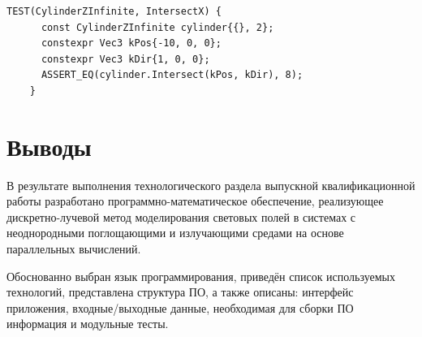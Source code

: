 \begin{lstlisting}[gobble=8, caption={Юнит-тест метода пересечения луча с поверхностью цилиндра\label{lst:cpp-unit-tests-intersection}}]
	TEST(CylinderZInfinite, IntersectX) {
	  const CylinderZInfinite cylinder{{}, 2};
	  constexpr Vec3 kPos{-10, 0, 0};
	  constexpr Vec3 kDir{1, 0, 0};
	  ASSERT_EQ(cylinder.Intersect(kPos, kDir), 8);
	}
\end{lstlisting}

\section*{Выводы}

В результате выполнения технологического раздела выпускной квалификационной работы разработано программно-математическое обеспечение, реализующее дискретно-лучевой метод моделирования световых полей в системах с неоднородными поглощающими и излучающими средами на основе параллельных вычислений.

Обоснованно выбран язык программирования, приведён список используемых технологий, представлена структура ПО, а также описаны: интерфейс приложения, входные/выходные данные, необходимая для сборки ПО информация и модульные тесты.
